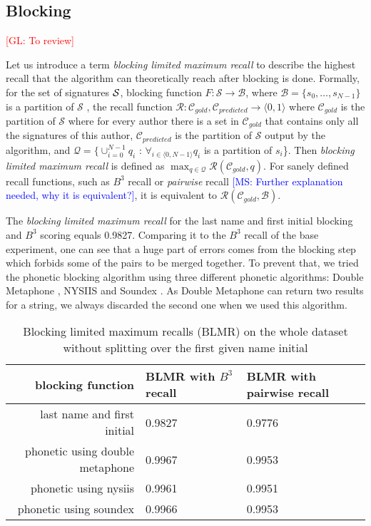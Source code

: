 \documentclass{article}
\newcommand{\glnote}[1]{\textcolor{red}{[GL: #1]}}
\newcommand{\msnote}[1]{\textcolor{blue}{[MS: #1]}}
\begin{document}
\subsection{Blocking}

\glnote{To review}

Let us introduce a term \textit{blocking limited maximum recall} to describe the highest
recall that the algorithm can theoretically reach after blocking is done.
Formally, for the set of signatures ${\cal S}$, blocking function $F: \mathcal{S}
\rightarrow \mathcal{B}$, where $ \mathcal{B} = \{s_{0}, \ldots{} , s_{N-1}\}$ is a
partition of $\mathcal{S} $ , the recall function $\mathcal{R}: \mathcal{C}_{gold},
\mathcal{C}_{predicted} \rightarrow \langle0,1\rangle$ where $\mathcal{C}_{gold}$ is the
partition of $\mathcal{S}$ where for every author there is a set in $\mathcal{C}_{gold}$
that contains only all the signatures of this author, $\mathcal{C}_{predicted}$ is the
partition of $\mathcal{S}$ output by the algorithm, and $\mathcal{Q} = \{\cup_{i=0}^{N-1}
q_i $ : $\forall_{i \in \langle0,N-1\rangle} q_i$ is a partition of $s_i$\}. Then
\textit{blocking limited maximum recall} is defined as $\max_{q \in \mathcal{Q}}
\mathcal{R}(\mathcal{C}_{gold}, q)$. For sanely defined recall functions, such as $B^{3}$
recall or \textit{pairwise} recall \msnote{Further explanation needed, why it is
equivalent?}, it is equivalent to $\mathcal{R}(\mathcal{C}_{gold}, \mathcal{B})$.

The \textit{blocking limited maximum recall} for the last name and first initial blocking
and $B^3$ scoring equals 0.9827. Comparing it to the $B^3$ recall of the base experiment,
one can see that a huge part of errors comes from the blocking step which forbids some of
the pairs to be merged together. To prevent that, we tried the phonetic blocking algorithm
using three different phonetic algorithms: Double Metaphone \citep{doublemetaphone}, NYSIIS
\citep{nysiis} and Soundex \citep{Soundex}. As Double Metaphone can return two results for a
string, we always discarded the second one when we used this algorithm.

\begin{table}[H]
\caption{Blocking limited maximum recalls (BLMR) on the whole dataset without splitting over
the first given name initial}
\centering
\begin{tabular}{|r|l|l|}
  \hline
  blocking function & BLMR with $B^{3}$ recall & BLMR with pairwise recall \\
  \hline
  last name and first initial & 0.9827 & 0.9776 \\
  \hline
  phonetic using double metaphone & 0.9967 & 0.9953 \\
  \hline
  phonetic using nysiis & 0.9961 & 0.9951 \\
  \hline
  phonetic using soundex & 0.9966 & 0.9953 \\
  \hline
\end{tabular}
\end{table}
\end{document}
